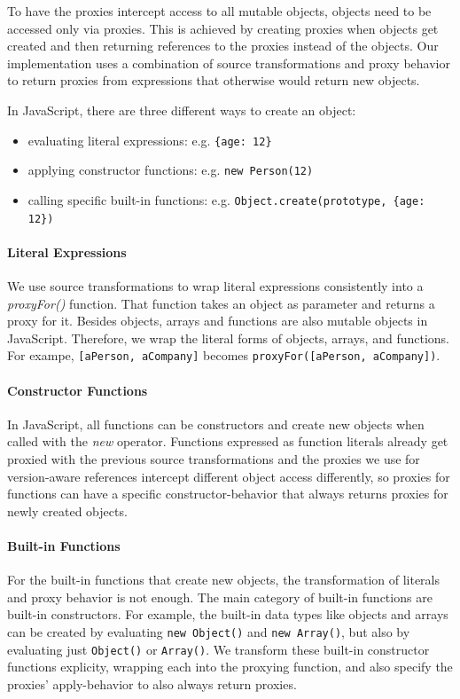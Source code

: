 To have the proxies intercept access to all mutable objects, objects need to be accessed only via proxies.
This is achieved by creating proxies when objects get created and then returning references to the proxies instead of the objects.
Our implementation uses a combination of source transformations and proxy behavior to return proxies from expressions that otherwise would return new objects.

In JavaScript, there are three different ways to create an object: 
\begin{itemize}
    \item evaluating literal expressions: e.g. \lstinline|{age: 12}|
    \item applying constructor functions: e.g. \lstinline|new Person(12)|
    \item calling specific built-in functions: e.g. \lstinline|Object.create(prototype, {age: 12})|
\end{itemize}

\paragraph{Literal Expressions}
We use source transformations to wrap literal expressions consistently into a \emph{proxyFor()} function.
That function takes an object as parameter and returns a proxy for it.
Besides objects, arrays and functions are also mutable objects in JavaScript.
Therefore, we wrap the literal forms of objects, arrays, and functions.
For exampe, \lstinline{[aPerson, aCompany]} becomes \lstinline{proxyFor([aPerson, aCompany])}.

\paragraph{Constructor Functions} 
In JavaScript, all functions can be constructors and create new objects when called with the \emph{new} operator.
Functions expressed as function literals already get proxied with the previous source transformations and the proxies we use for version-aware references intercept different object access differently, so proxies for functions can have a specific constructor-behavior that always returns proxies for newly created objects.

\paragraph{Built-in Functions}
For the built-in functions that create new objects, the transformation of literals and proxy behavior is not enough.
The main category of built-in functions are built-in constructors.
For example, the built-in data types like objects and arrays can be created by evaluating \lstinline{new Object()} and \lstinline{new Array()}, but also by evaluating just \lstinline{Object()} or \lstinline{Array()}.
We transform these built-in constructor functions explicity, wrapping each into the proxying function, and also specify the proxies' apply-behavior to also always return proxies.

